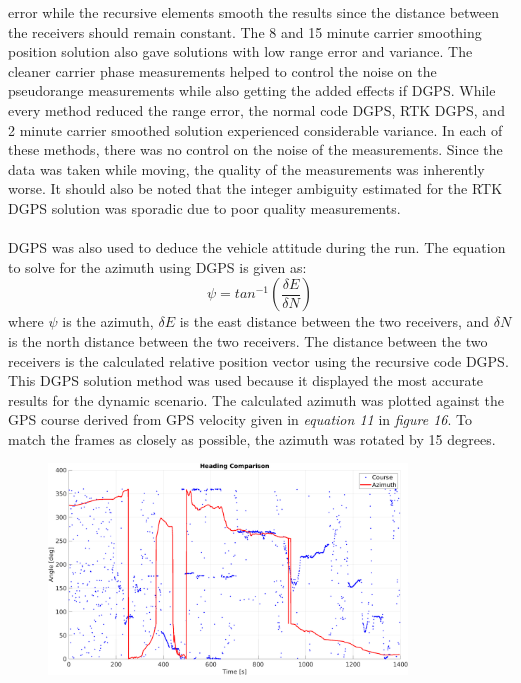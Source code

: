 \documentclass[11pt]{article}
\begin{document}
\begin{enumerate}[label=\textbf{\arabic*.}]
      error while the recursive elements smooth the results since the distance between the 
      receivers should remain constant. The 8 and 15 minute carrier 
      smoothing position solution also gave solutions with low range error and variance. The 
      cleaner carrier phase measurements helped to control the noise on the pseudorange 
      measurements while also getting the added effects if DGPS. While every method reduced 
      the range error, the normal code DGPS, RTK DGPS, and 2 minute carrier smoothed solution 
      experienced considerable variance. In each of these methods, there was no control on 
      the noise of the measurements. Since the data was taken while moving, the quality of 
      the measurements was inherently worse. It should also be noted that the integer 
      ambiguity estimated for the RTK DGPS solution was sporadic due to poor quality 
      measurements. 
      \\ \\
      DGPS was also used to deduce the vehicle attitude during the run. The equation to 
      solve for the azimuth using DGPS is given as:
      \begin{equation}
        \psi=tan^{-1}\left({\dfrac{\delta E}{\delta N}}\right)
      \end{equation}
      where $\psi$ is the azimuth, $\delta E$ is the east distance between the two receivers, 
      and $\delta N$ is the north distance between the two receivers. The distance between 
      the two receivers is the calculated relative position vector using the recursive code 
      DGPS. This DGPS solution method was used because it displayed the most accurate results 
      for the dynamic scenario. The calculated azimuth was plotted against the GPS course 
      derived from GPS velocity given in \emph{equation 11} in \emph{figure 16}. To match 
      the frames as closely as possible, the azimuth was rotated by 15 degrees.
      \begin{figure}[H]
        \centering
        \includegraphics[width=0.85\textwidth]{p3_e.png}

\end{figure}
\end{enumerate}
\end{document}
